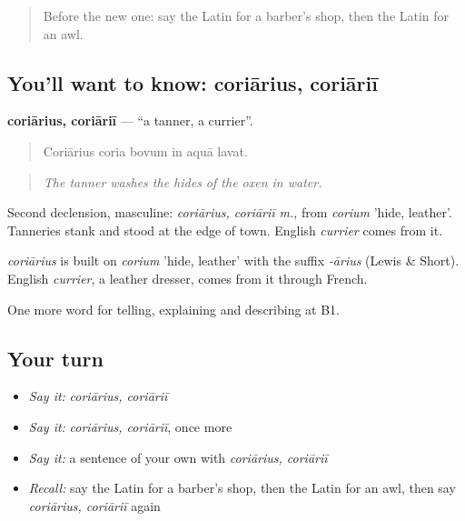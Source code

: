 \label{lesson:LA-C467-coriarius}



\begin{quote}
Before the new one: say the Latin for a barber's shop, then the Latin for an awl.
\end{quote}

\subsection*{You'll want to know: coriārius, coriāriī}
\textbf{coriārius, coriāriī} — \textquotedblleft{}a tanner, a currier\textquotedblright{}.

\begin{quote}
Coriārius coria bovum in aquā lavat.
\end{quote}

\begin{quote}
\emph{The tanner washes the hides of the oxen in water.}
\end{quote}

Second declension, masculine: \emph{coriārius, coriāriī m.}, from \emph{corium} 'hide, leather'. Tanneries stank and stood at the edge of town. English \emph{currier} comes from it.

\begin{cousinweb}
\emph{coriārius} is built on \emph{corium} 'hide, leather' with the suffix \emph{-ārius} (Lewis \& Short). English \emph{currier}, a leather dresser, comes from it through French.
\end{cousinweb}

\begin{grammarlens}[title={What you've built}]
One more word for telling, explaining and describing at B1.
\end{grammarlens}

\subsection*{Your turn}
\begin{itemize}
\raggedright
  \item \emph{Say it:} \emph{coriārius, coriāriī}
  \item \emph{Say it:} \emph{coriārius, coriāriī}, once more
  \item \emph{Say it:} a sentence of your own with \emph{coriārius, coriāriī}
  \item \emph{Recall:} say the Latin for a barber's shop, then the Latin for an awl, then say \emph{coriārius, coriāriī} again
\end{itemize}

